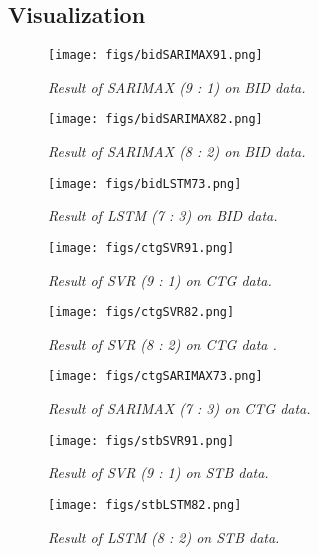 \documentclass{ieeeojies}
\begin{document}
\subsection{Visualization}
\begin{figure}[H]
    \centering
    \texttt{[image: figs/bidSARIMAX91.png]}
    \caption{\centering \textit{Result of SARIMAX (9 : 1) on BID data.}}
    \label{fig:enter-label}
\end{figure}

\begin{figure}[H]
    \centering
    \texttt{[image: figs/bidSARIMAX82.png]}
    \caption{\centering \textit{Result of SARIMAX (8 : 2) on BID data.}}
    \label{fig:enter-label}
\end{figure}
\vspace{-0.8cm}
\begin{figure}[H]
    \centering
    \texttt{[image: figs/bidLSTM73.png]}
    \caption{\centering \textit{Result of LSTM (7 : 3) on BID data.}}
    \label{fig:enter-label}
\end{figure}

\begin{figure}[H]
    \centering
    \texttt{[image: figs/ctgSVR91.png]}
    \caption{\centering \textit{Result of SVR (9 : 1) on CTG data.}}
    \label{fig:enter-label}
\end{figure}

\begin{figure}[H]
    \centering
    \texttt{[image: figs/ctgSVR82.png]}
    \caption{\centering \textit{Result of SVR (8 : 2) on CTG data .}}
    \label{fig:enter-label}
\end{figure}

\begin{figure}[H]
    \centering
    \texttt{[image: figs/ctgSARIMAX73.png]}
    \caption{\centering \textit{Result of SARIMAX (7 : 3) on CTG data.}}
    \label{fig:enter-label}
\end{figure}


\begin{figure}[H]
    \centering
    \texttt{[image: figs/stbSVR91.png]}
    \caption{\centering \textit{Result of SVR (9 : 1) on STB data.}}
    \label{fig:enter-label}
\end{figure}

\begin{figure}[H]
    \centering
    \texttt{[image: figs/stbLSTM82.png]}
    \caption{\centering \textit{Result of LSTM (8 : 2) on STB data.}}
    \label{fig:enter-label}
\end{figure}
\end{document}

